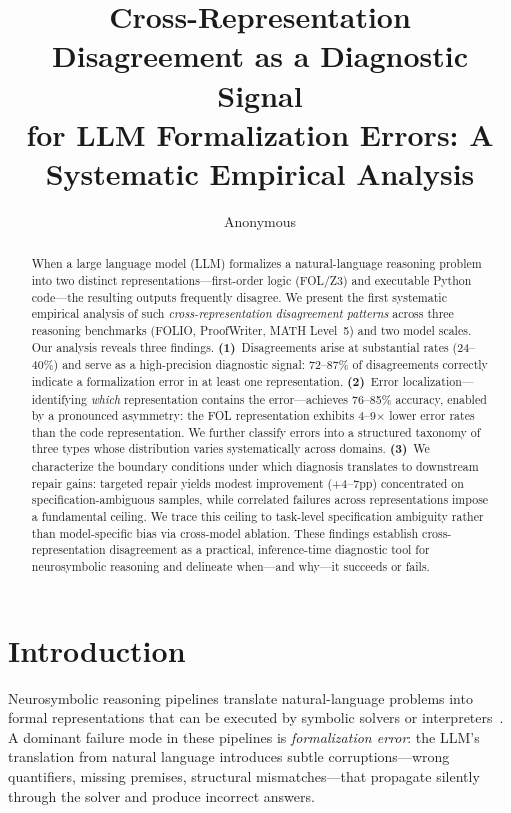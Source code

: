 \documentclass[11pt,a4paper]{article}
\title{Cross-Representation Disagreement as a Diagnostic Signal\\for LLM Formalization Errors: A Systematic Empirical Analysis}
\author{Anonymous}
\begin{document}
\maketitle

\begin{abstract}
When a large language model (LLM) formalizes a natural-language reasoning problem into two distinct representations---first-order logic (FOL/Z3) and executable Python code---the resulting outputs frequently disagree. We present the first systematic empirical analysis of such \emph{cross-representation disagreement patterns} across three reasoning benchmarks (FOLIO, ProofWriter, MATH Level~5) and two model scales. Our analysis reveals three findings. \textbf{(1)}~Disagreements arise at substantial rates (24--40\%) and serve as a high-precision diagnostic signal: 72--87\% of disagreements correctly indicate a formalization error in at least one representation. \textbf{(2)}~Error localization---identifying \emph{which} representation contains the error---achieves 76--85\% accuracy, enabled by a pronounced asymmetry: the FOL representation exhibits 4--9$\times$ lower error rates than the code representation. We further classify errors into a structured taxonomy of three types whose distribution varies systematically across domains. \textbf{(3)}~We characterize the boundary conditions under which diagnosis translates to downstream repair gains: targeted repair yields modest improvement (+4--7pp) concentrated on specification-ambiguous samples, while correlated failures across representations impose a fundamental ceiling. We trace this ceiling to task-level specification ambiguity rather than model-specific bias via cross-model ablation. These findings establish cross-representation disagreement as a practical, inference-time diagnostic tool for neurosymbolic reasoning and delineate when---and why---it succeeds or fails.
\end{abstract}

\section{Introduction}
\label{sec:intro}

Neurosymbolic reasoning pipelines translate natural-language problems into formal representations that can be executed by symbolic solvers or interpreters~\cite{pan2023logic,ye2024satlm}. A dominant failure mode in these pipelines is \emph{formalization error}: the LLM's translation from natural language introduces subtle corruptions---wrong quantifiers, missing premises, structural mismatches---that propagate silently through the solver and produce incorrect answers.
\end{document}

